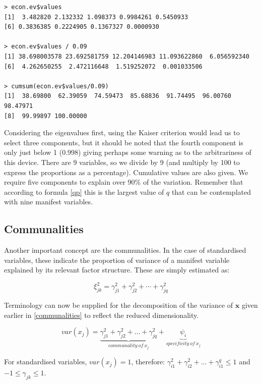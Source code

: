 \singlespacing
\begin{verbatim}
> econ.ev$values
[1]  3.482820 2.132332 1.098373 0.9984261 0.5450933
[6] 0.3836385 0.2224905 0.1367327 0.0000930
 
> econ.ev$values / 0.09
[1] 38.698003578 23.692581759 12.204146983 11.093622860  6.056592340
[6]  4.262650255  2.472116648  1.519252072  0.001033506

> cumsum(econ.ev$values/0.09)
[1]  38.69800  62.39059  74.59473  85.68836  91.74495  96.00760  98.47971
[8]  99.99897 100.00000
\end{verbatim}
\onehalfspacing

Considering the eigenvalues first, using the Kaiser criterion would lead us to select three components, but it should be noted that the fourth component is only just below 1 (0.998) giving perhaps some warning as to the arbitrariness of this device.   There are 9 variables, so we divide by 9 (and multiply by 100 to express the proportions as a percentage).   Cumulative values are also given.   We require five components to explain over 90\% of the variation.   Remember that according to formula \ref{qp} this is the largest value of $q$ that can be contemplated with nine manifest variables.


\subsection{Communalities}

Another important concept are the communalities.   In the case of standardised variables, these indicate the proportion of variance of a manifest variable explained by its relevant factor structure.   These are simply estimated as:

\begin{equation}
\xi_{jk}^{2} = \gamma_{j1}^{2} +  \gamma_{j2}^{2} + \cdots +  \gamma_{jq}^{2}
\end{equation}

Terminology can now be supplied for the decomposition of the variance of $\boldsymbol{x}$ given earlier in \ref{communalities} to reflect the reduced dimensionality.   

\begin{equation}
\label{communality}
var(x_{j}) = \underbrace{\gamma_{j1}^{2} + \gamma_{j2}^{2} + \ldots + \gamma_{jq}^{2}}_{communality\ of\ x_{j}} + \underbrace{\psi_{i}}_{specificity\ of\ x_{j}}
\end{equation} 

For standardised variables, $var(x_{j}) = 1$, therefore: $\gamma_{i1}^{2} + \gamma_{i2}^{2} + \ldots + \gamma_{i1}^{q} \leq 1$ and $-1 \leq \gamma_{jk} \leq 1$.

